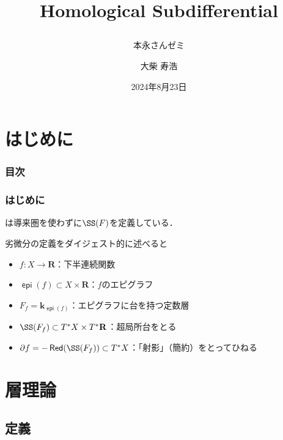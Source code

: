 \documentclass[dvipdfmx,12pt,aspectratio=169,leqno]{beamer}%
\title{Homological Subdifferential
\subtitle{本永さんゼミ}}
\date{2024年8月23日}
\author{大柴 寿浩}
\newcommand{\rr}{\mathbf{R}}
\newcommand{\kk}{\mathbf{k}}
\newcommand{\p}{\partial}
\numberwithin{equation}{subsection}
\newcommand{\Red}{\mathop{\mathsf{Red}}\nolimits}
\newcommand{\epi}{\mathop{\mathsf{epi}}\nolimits}
\theoremstyle{mystyle}
\begin{document}
\begin{frame}
    \titlepage
\end{frame}
\begin{comment}
    \begin{frame}\frametitle{書くこと}
    \begin{itemize}
        \item 特に興味を持った定理や理論の背景
        \item それを記述するための記号や概念の導入
        \item 正確な主張の紹介
        \item 証明の基本的なアイデアやアウトラインの紹介
        \item または定理の過程を満たす具体例や定理の応用例の紹介
    \end{itemize}
    \end{frame}
\end{comment}
\section*{はじめに}
\begin{frame}
    \frametitle{目次}
    \tableofcontents
\end{frame}

\begin{frame}
    \frametitle{はじめに}
    \cite{Ike24}は導来圏を使わずに\(\SS(F)\)を定義している．

    \bigskip
    劣微分の定義をダイジェスト的に述べると
    \begin{itemize}
        \item \(f\colon X\to \rr\)：下半連続関数
        \item \(\epi(f)\subset X\times \rr\)：\(f\)のエピグラフ
        \item \(F_{f}=\kk_{\epi(f)}\)：エピグラフに台を持つ定数層
        \item \(\SS(F_{f})\subset T^{\ast}X\times T^{\ast}\rr\)：超局所台をとる
        \item \(\p f = -\Red(\SS(F_{f}))\subset T^{\ast}X\)：「射影」（簡約）をとってひねる
    \end{itemize}
\end{frame}
\section[層]{層理論}
\subsection{定義}
\end{document}
